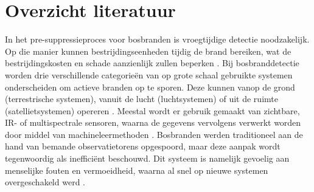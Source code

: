 \documentclass{hogent-article}
\begin{document}
\section{Overzicht literatuur}
In het pre-suppressieproces voor bosbranden is vroegtijdige detectie noodzakelijk. Op die manier kunnen bestrijdingseenheden tijdig de brand bereiken, wat de bestrijdingskosten en schade aanzienlijk zullen beperken \autocite{Breejen2001}. Bij bosbranddetectie worden drie verschillende categorieën van op grote schaal gebruikte systemen onderscheiden om actieve branden op te sporen. Deze kunnen vanop de grond (terrestrische systemen), vanuit de lucht (luchtsystemen) of uit de ruimte (satellietsystemen) opereren \autocite{Breejen2001, Barmpoutis2020}. Meestal wordt er gebruik gemaakt van zichtbare, IR- of multispectrale sensoren, waarna de gegevens vervolgens verwerkt worden door middel van machineleermethoden \autocite{Barmpoutis2020}.
Bosbranden werden traditioneel aan de hand van bemande observatietorens opgespoord, maar deze aanpak wordt tegenwoordig als inefficiënt beschouwd. Dit systeem is namelijk gevoelig  aan menselijke fouten en vermoeidheid, waarna al snel op nieuwe systemen overgeschakeld werd \autocite{Barmpoutis2020, Alkhatib2014}. 
\\
\end{document}
